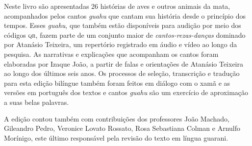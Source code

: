 Neste livro são apresentadas 26 histórias de aves e outros animais da
mata, acompanhados pelos cantos \emph{guahu} que cantam sua história
desde o princípio dos tempos. Esses \emph{guahu}, que também estão
disponíveis para audição por meio dos códigos \textsc{qr}, fazem parte de um
conjunto maior de \textit{cantos-rezas-danças} dominado por Atanásio Teixeira, um
repertório registrado em áudio e vídeo ao longo da pesquisa. As
narrativas e explicações que acompanham os cantos foram elaboradas por
Izaque João, a partir de falas e orientações de Atanásio Teixeira ao
longo dos últimos seis anos. Os processos de seleção, transcrição e
tradução para esta edição bilíngue também foram feitos em diálogo com o
xamã e as versões em português dos textos e cantos \emph{guahu} são um
exercício de aproximação a suas belas palavras.

A edição contou também com contribuições dos professores João Machado,
Gileandro Pedro, Veronice Lovato Rossato, Rosa Sebastiana Colman e
Arnulfo Morínigo, este último responsável pela revisão do texto em
língua guarani.